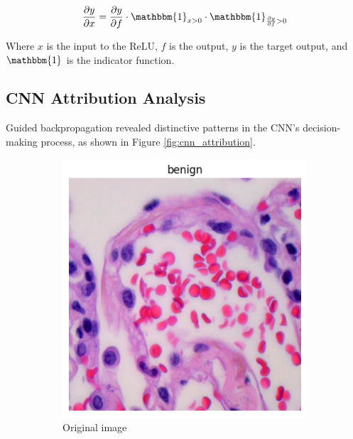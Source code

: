 \documentclass[10pt,twocolumn]{article}
\begin{document}
\begin{equation}
\frac{\partial y}{\partial x} = \frac{\partial y}{\partial f} \cdot \mathbbm{1}_{x > 0} \cdot \mathbbm{1}_{\frac{\partial y}{\partial f} > 0}
\end{equation}

Where $x$ is the input to the ReLU, $f$ is the output, $y$ is the target output, and $\mathbbm{1}$ is the indicator function.

\subsection{CNN Attribution Analysis}
Guided backpropagation revealed distinctive patterns in the CNN's decision-making process, as shown in Figure \ref{fig:cnn_attribution}.

\begin{figure}[h]
\centering
\begin{subfigure}{0.32\columnwidth}
\includegraphics[width=\linewidth]{imgs/normal_image.png}
\caption{Original image}
\end{subfigure}
\hfill
\begin{subfigure}{0.32\columnwidth}

\end{subfigure}
\end{figure}
\end{document}
